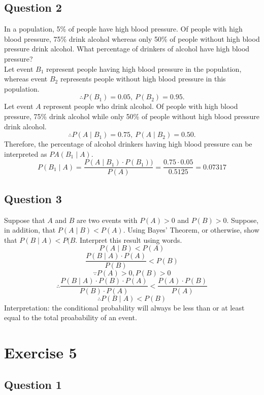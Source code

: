 \documentclass[
]{book}
\begin{document}
\section{Question 2}\label{question-2-2}

In a population, 5\% of people have high blood pressure. Of people with high blood pressure, 75\% drink alcohol whereas only 50\% of people without high blood pressure drink alcohol. What percentage of drinkers of alcohol have high blood pressure?\\

Let event \(B_1\) represent people having high blood pressure in the population, whereas event \(B_2\) represents people without high blood pressure in this population.
\[\therefore P(B_1) = 0.05, \ P(B_2) = 0.95.\]
Let event \(A\) represent people who drink alcohol. Of people with high blood pressure, 75\% drink alcohol while only 50\% of people without high blood pressure drink alcohol.
\[\therefore P(A \mid B_1) = 0.75, \ P(A \mid B_2) = 0.50.\]
Therefore, the percentage of alcohol drinkers having high blood pressure can be interpreted as \(PA(B_1 \mid A)\).
\[P(B_1 \mid A) = \frac{P(A \mid B_1) \cdot P(B_1))}{P(A)} = \frac{0.75 \cdot 0.05}{0.5125} = 0.07317\]

\section{Question 3}\label{question-3-2}

Suppose that \(A\) and \(B\) are two events with \(P(A) > 0\) and \(P(B) > 0\). Suppose, in addition, that \(P(A \mid B) < P(A)\). Using Bayes' Theorem, or otherwise, show that \(P(B \mid A) < P(B\). Interpret this result using words.
\[P(A \mid B) < P(A)\]
\[\frac{P(B \mid A) \cdot P(A)}{P(B)} < P(B)\]
\[\because P(A) > 0, P(B) > 0\]
\[\therefore \frac{P(B \mid A) \cdot P(B) \cdot P(A)}{P(B) \cdot P(A)} < \frac{P(A) \cdot P(B)}{P(A)}\]
\[\therefore P(B \mid A) < P(B)\]
Interpretation: the conditional probability will always be less than or at least equal to the total proabability of an event.

\chapter{Exercise 5}\label{exercise-5}

\section{Question 1}\label{question-1-3}
\end{document}
